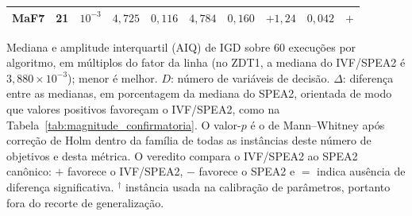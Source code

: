 \begin{table}[!htb]
\begin{tabular*}{\textwidth}{@{\extracolsep{\fill}}lrcrrrrrrc@{}}
        MaF7 & 21 & $10^{-3}$ & $4{,}725$ & $0{,}116$ & $4{,}784$ & $0{,}160$ & $+1{,}24$ & $0{,}042$ & $+$ \\
        \bottomrule
    \end{tabular*}
    \par\smallskip
    \parbox{\textwidth}{\footnotesize
    Mediana e amplitude interquartil (AIQ) de IGD sobre 60 execuções por algoritmo, em múltiplos do fator da linha (no ZDT1, a mediana do IVF/SPEA2 é $3{,}880 \times 10^{-3}$); menor é melhor. $D$: número de variáveis de decisão. $\Delta$: diferença entre as medianas, em porcentagem da mediana do SPEA2, orientada de modo que valores positivos favoreçam o IVF/SPEA2, como na Tabela~\ref{tab:magnitude_confirmatoria}. O valor-$p$ é o de Mann--Whitney após correção de Holm dentro da família de todas as instâncias deste número de objetivos e desta métrica. O veredito compara o IVF/SPEA2 ao SPEA2 canônico: $+$ favorece o IVF/SPEA2, $-$ favorece o SPEA2 e $=$ indica ausência de diferença significativa. $^{\dagger}$ instância usada na calibração de parâmetros, portanto fora do recorte de generalização.
    }
\end{table}
